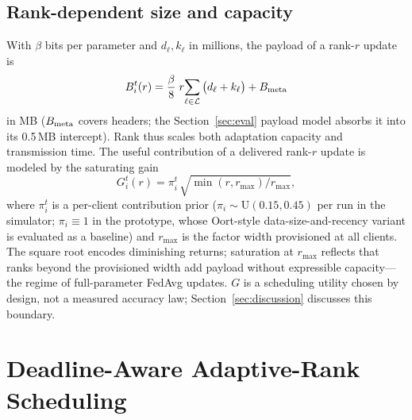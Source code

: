 \documentclass[conference]{IEEEtran}
\begin{document}
\subsection{Rank-dependent size and capacity}
With $\beta$ bits per parameter and $d_\ell,k_\ell$ in millions, the payload of a rank-$r$ update is
\begin{equation}
B_i^t(r)=\frac{\beta}{8}\;r\!\sum_{\ell\in\mathcal L}\big(d_\ell+k_\ell\big)+B_{\rm meta}
\label{eq:size}
\end{equation}
in MB ($B_{\rm meta}$ covers headers; the Section~\ref{sec:eval} payload model absorbs it into its 0.5\,MB intercept). Rank thus scales both adaptation capacity and transmission time. The useful contribution of a delivered rank-$r$ update is modeled by the saturating gain
\begin{equation}
G_i^t(r)=\pi_i^t\,\sqrt{\min(r,r_{\max})/r_{\max}},
\label{eq:cap}
\end{equation}
where $\pi_i^t$ is a per-client contribution prior ($\pi_i\sim\mathrm{U}(0.15,0.45)$ per run in the simulator; $\pi_i\equiv1$ in the prototype, whose Oort-style data-size-and-recency variant \cite{oort2021oort} is evaluated as a baseline) and $r_{\max}$ is the factor width provisioned at all clients. The square root encodes diminishing returns; saturation at $r_{\max}$ reflects that ranks beyond the provisioned width add payload without expressible capacity---the regime of full-parameter FedAvg updates. $G$ is a scheduling utility chosen by design, not a measured accuracy law; Section~\ref{sec:discussion} discusses this boundary.

\section{Deadline-Aware Adaptive-Rank Scheduling}
\label{sec:problem}
\end{document}

